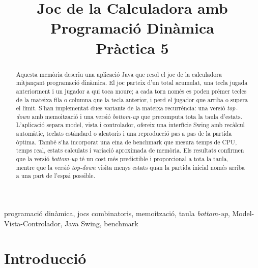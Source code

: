 \documentclass[conference,compsoc]{IEEEtran}
\begin{document}
\title{Joc de la Calculadora amb Programació Dinàmica\\Pràctica 5}

\author{
}

\maketitle

\begin{strip}
\begin{abstract}
Aquesta memòria descriu una aplicació Java que resol el joc de la calculadora
mitjançant programació dinàmica. El joc parteix d'un total acumulat, una tecla
jugada anteriorment i un jugador a qui toca moure; a cada torn només es poden
prémer tecles de la mateixa fila o columna que la tecla anterior, i perd el
jugador que arriba o supera el límit. S'han implementat dues variants de la
mateixa recurrència: una versió \textit{top-down} amb memoització i una versió
\textit{bottom-up} que precomputa tota la taula d'estats. L'aplicació separa
model, vista i controlador, ofereix una interfície Swing amb recàlcul automàtic,
teclats estàndard o aleatoris i una reproducció pas a pas de la partida òptima.
També s'ha incorporat una eina de benchmark que mesura temps de CPU, temps real,
estats calculats i variació aproximada de memòria. Els resultats confirmen que
la versió \textit{bottom-up} té un cost més predictible i proporcional a tota la
taula, mentre que la versió \textit{top-down} visita menys estats quan la partida
inicial només arriba a una part de l'espai possible.
\end{abstract}

\begin{IEEEkeywords}
programació dinàmica, jocs combinatoris, memoització, taula \textit{bottom-up},
Model-Vista-Controlador, Java Swing, benchmark
\end{IEEEkeywords}
\end{strip}

\IEEEpeerreviewmaketitle

\section{Introducció}
\end{document}
